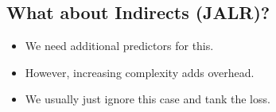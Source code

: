 \documentclass[10pt]{article}
\begin{document}
\subsection*{What about Indirects (JALR)?}
\begin{itemize}
    \item We need additional predictors for this.
    \item However, increasing complexity adds overhead.
    \item We usually just ignore this case and tank the loss.
\end{itemize}
\end{document}
